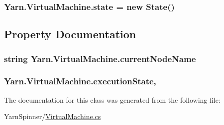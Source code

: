 \hypertarget{a00138_a70f2ce6201cdd2430ceaa764ac614ca0}{
\subsubsection[{state}]{ Yarn.\-Virtual\-Machine.\-state = new {\bf State}()\hspace{0.3cm}{\ttfamily [private]}}}\label{a00138_a70f2ce6201cdd2430ceaa764ac614ca0}


\subsection{Property Documentation}
\hypertarget{a00138_ab3afe8360a344c16c21213edb3641481}{
\subsubsection[{current\-Node\-Name}]{\setlength{\rightskip}{0pt plus 5cm}string Yarn.\-Virtual\-Machine.\-current\-Node\-Name\hspace{0.3cm}{\ttfamily [get]}}}\label{a00138_ab3afe8360a344c16c21213edb3641481}
\hypertarget{a00138_a66491da06023dabfb63d09e6ccbba74f}{
\subsubsection[{execution\-State}]{ Yarn.\-Virtual\-Machine.\-execution\-State\hspace{0.3cm}{\ttfamily [get]}, {\ttfamily [set]}}}\label{a00138_a66491da06023dabfb63d09e6ccbba74f}


The documentation for this class was generated from the following file\-:\begin{DoxyCompactItemize}
\item 
Yarn\-Spinner/\hyperlink{a00271}{Virtual\-Machine.\-cs}\end{DoxyCompactItemize}
